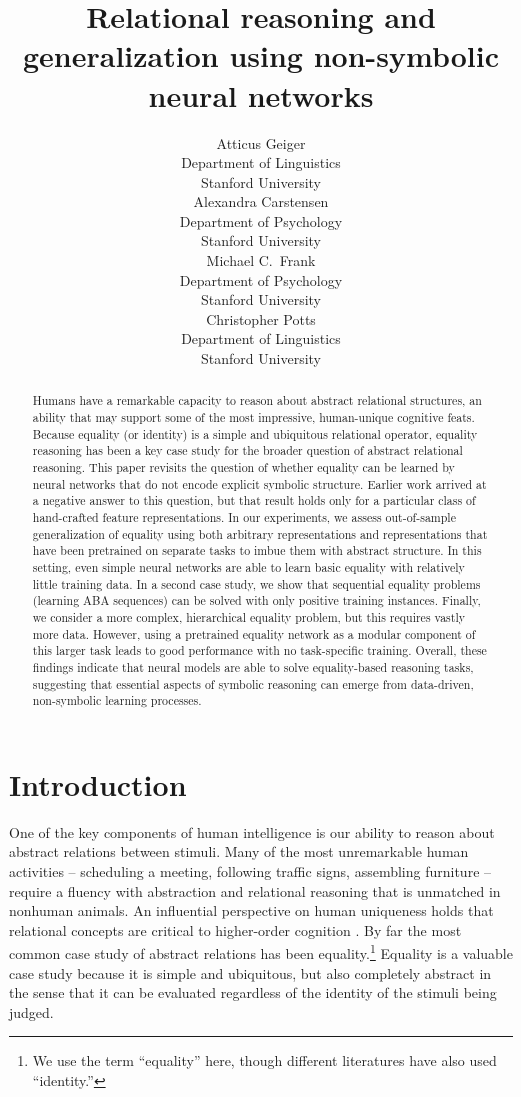 \documentclass{article}
\title{Relational reasoning and generalization using non-symbolic neural networks}
\author{%
  Atticus Geiger \\
  Department of Linguistics\\
  Stanford University \\
  \And
  Alexandra Carstensen \\
  Department of Psychology \\
  Stanford University \\
  \AND
  Michael C.~Frank \\
  Department of Psychology \\
  Stanford University \\
  \And
  Christopher Potts \\
  Department of Linguistics\\
  Stanford University
}
\newcommand{\dropcap}[1]{#1}
\begin{document}
\maketitle


\begin{abstract}
  Humans have a remarkable capacity to reason about abstract relational structures, an ability that may support some of the most impressive, human-unique cognitive feats. Because equality (or identity) is a simple and ubiquitous relational operator, equality reasoning has been a key case study for the broader question of abstract relational reasoning. This paper revisits the question of whether equality can be learned by neural networks that do not encode explicit symbolic structure. Earlier work arrived at a negative answer to this question, but that result holds only for a particular class of hand-crafted feature representations. In our experiments, we assess out-of-sample generalization of equality using both arbitrary representations and representations that have been pretrained on separate tasks to imbue them with abstract structure. In this setting, even simple neural networks are able to learn basic equality with relatively little training data. In a second case study, we show that sequential equality problems (learning ABA sequences) can be solved with only positive training instances. Finally, we consider a more complex, hierarchical equality problem, but this requires vastly more data. However, using a pretrained equality network as a modular component of this larger task leads to good performance with no task-specific training. Overall, these findings indicate that neural models are able to solve equality-based reasoning tasks, suggesting that essential aspects of symbolic reasoning can emerge from data-driven, non-symbolic learning processes.
\end{abstract}


\section{Introduction}\label{sec:introduction}


\dropcap{O}ne of the key components of human intelligence is our ability to reason about abstract relations between stimuli. Many of the most unremarkable human activities -- scheduling a meeting, following traffic signs, assembling furniture -- require a fluency with abstraction and relational reasoning that is unmatched in nonhuman animals. An influential perspective on human uniqueness holds that relational concepts are critical to higher-order cognition \citep[e.g.,][]{Gentner:2003}. By far the most common case study of abstract relations has been equality.\footnote{We use the term ``equality'' here, though different literatures have also used ``identity.''} Equality is a valuable case study because it is simple and ubiquitous, but also completely abstract in the sense that it can be evaluated regardless of the identity of the stimuli being judged.
\end{document}
